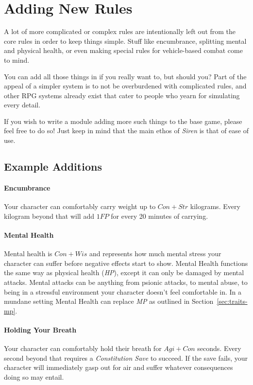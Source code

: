 \section{Adding New Rules}\label{sec:hacking-rules}
A lot of more complicated or complex rules are intentionally left out from the core rules in order to keep things simple.
Stuff like encumbrance, splitting mental and physical health, or even making special rules for vehicle-based combat come to mind.

You can add all those things in if you really want to, but should you?
Part of the appeal of a simpler system is to not be overburdened with complicated rules, and other RPG systems already exist that cater to people who yearn for simulating every detail.

If you wish to write a module adding more such things to the base game, please feel free to do so! Just keep in mind that the main ethos of \textit{Siren} is that of ease of use.

\subsection{Example Additions}

\paragraph{Encumbrance} Your character can comfortably carry weight up to $Con + Str$ kilograms. 
Every kilogram beyond that will add $1FP$ for every 20 minutes of carrying.

\paragraph{Mental Health} Mental health is $Con + Wis$ and represents how much mental stress your character can suffer before negative effects start to show.
Mental Health functions the same way as physical health (\textit{HP}), except it can only be damaged by mental attacks.
Mental attacks can be anything from psionic attacks, to mental abuse, to being in a stressful environment your character doesn't feel comfortable in.
In a mundane setting Mental Health can replace \textit{MP} as outlined in Section~\ref{sec:traits-mp}.

\paragraph{Holding Your Breath} Your character can comfortably hold their breath for $Agi + Con$ seconds.
Every second beyond that requires a \textit{Constitution Save} to succeed.
If the save fails, your character will immediately gasp out for air and suffer whatever consequences doing so may entail.